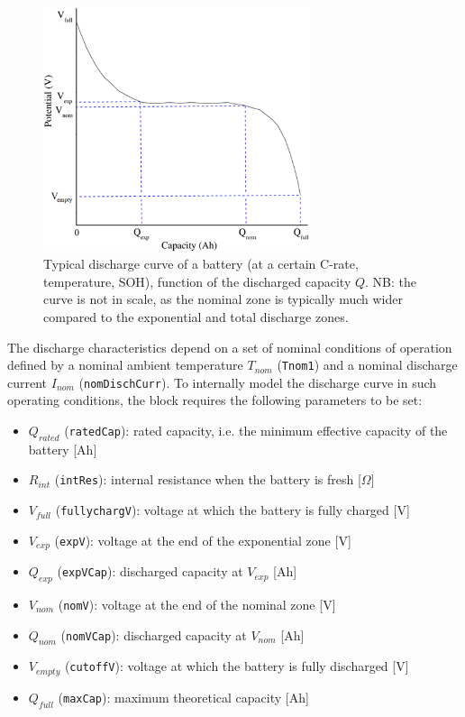 \begin{figure}[htb]
    \centering
    \includegraphics[width=0.7\textwidth]{images/discharge_curve.png}
    \caption[Discharge curve of a battery]{Typical discharge curve of a battery (at a certain C-rate, temperature, SOH), function of the discharged capacity $Q$. NB: the curve is not in scale, as the nominal zone is typically much wider compared to the exponential and total discharge zones.}
    \label{fig:discharge_curve}
\end{figure}

The discharge characteristics depend on a set of nominal conditions of operation defined by a nominal ambient temperature $T_{nom}$ (\texttt{Tnom1}) and a nominal discharge current $I_{nom}$ (\texttt{nomDischCurr}). To internally model the discharge curve in such operating conditions, the block requires the following parameters to be set:
\begin{itemize}
\item $Q_{rated}$ (\texttt{ratedCap}): rated capacity, i.e. the minimum effective capacity of the battery [Ah]
\item $R_{int}$ (\texttt{intRes}): internal resistance when the battery is fresh [$\Omega$]
\item $V_{full}$ (\texttt{fullychargV}): voltage at which the battery is fully charged [V]
\item $V_{exp}$ (\texttt{expV}): voltage at the end of the exponential zone [V]
\item $Q_{exp}$ (\texttt{expVCap}): discharged capacity at $V_{exp}$ [Ah]
\item $V_{nom}$ (\texttt{nomV}): voltage at the end of the nominal zone [V]
\item $Q_{nom}$ (\texttt{nomVCap}): discharged capacity at $V_{nom}$ [Ah]
\item $V_{empty}$ (\texttt{cutoffV}): voltage at which the battery is fully discharged [V]
\item $Q_{full}$ (\texttt{maxCap}): maximum theoretical capacity [Ah]
\end{itemize}


